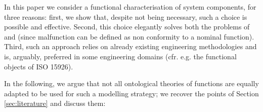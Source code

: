 \documentclass[
]{ceurart}
\begin{document}
In this paper we consider a functional characterisation of system components, for three reasons: first, we show that, despite not being necessary, such a choice is possible and effective. Second, this choice elegantly solves both the problems of  and  (since malfunction can be defined as non conformity to a nominal function). Third, such an approach relies on already existing engineering methodologies and is, arguably, preferred in some engineering domains (cfr. e.g. the functional objects of ISO 15926).

In the following, we argue that not all ontological theories of functions are equally adapted to be used for such a modelling strategy; we recover the points of Section \ref{sec:literature} and discuss them: 
\end{document}
